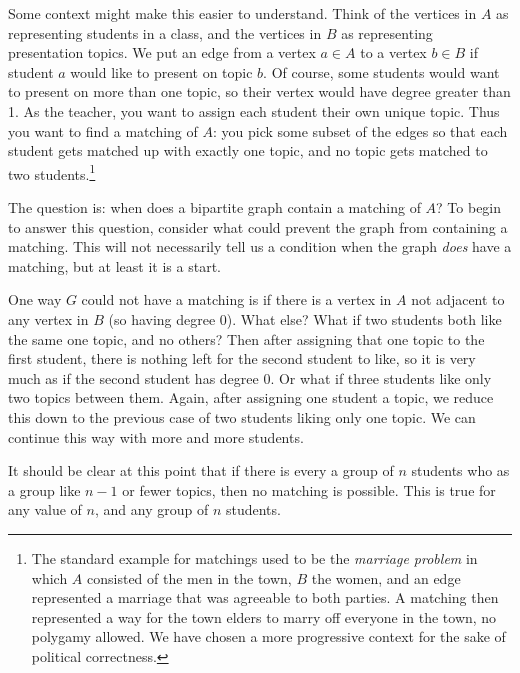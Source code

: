 \documentclass[10pt,]{book}
\theoremstyle{plain}
\theoremstyle{definition}
\theoremstyle{definition}
\theoremstyle{definition}
\numberwithin{equation}{chapter}
\begin{document}
Some context might make this easier to understand. Think of the vertices in \(A\) as representing students in a class, and the vertices in \(B\) as representing presentation topics. We put an edge from a vertex \(a \in A\) to a vertex \(b \in B\) if student \(a\) would like to present on topic \(b\). Of course, some students would want to present on more than one topic, so their vertex would have degree greater than 1. As the teacher, you want to assign each student their own unique topic. Thus you want to find a matching of \(A\): you pick some subset of the edges so that each student gets matched up with exactly one topic, and no topic gets matched to two students.\footnote{The standard example for matchings used to be the \emph{marriage problem} in which \(A\) consisted of the men in the town, \(B\) the women, and an edge represented a marriage that was agreeable to both parties.  A matching then represented a way for the town elders to marry off everyone in the town, no polygamy allowed.  We have chosen a more progressive context for the sake of political correctness.\label{fn-16}}
%
\par

The question is: when does a bipartite graph contain a matching of \(A\)? To begin to answer this question, consider what could prevent the graph from containing a matching. This will not necessarily tell us a condition when the graph \emph{does} have a matching, but at least it is a start.
%
\par

One way \(G\) could not have a matching is if there is a vertex in \(A\) not adjacent to any vertex in \(B\) (so having degree 0). What else? What if two students both like the same one topic, and no others? Then after assigning that one topic to the first student, there is nothing left for the second student to like, so it is very much as if the second student has degree 0. Or what if three students like only two topics between them. Again, after assigning one student a topic, we reduce this down to the previous case of two students liking only one topic. We can continue this way with more and more students.

%
\par

It should be clear at this point that if there is every a group of \(n\) students who as a group like \(n-1\) or fewer topics, then no matching is possible. This is true for any value of \(n\), and any group of \(n\) students.
%
\par
\end{document}
